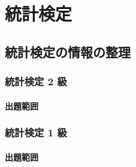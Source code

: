 
\part{統計検定}

\chapter{統計検定の情報の整理}

\section{統計検定 2 級}

\subsection{出題範囲}

\newpage

\section{統計検定 1 級}

\subsection{出題範囲}